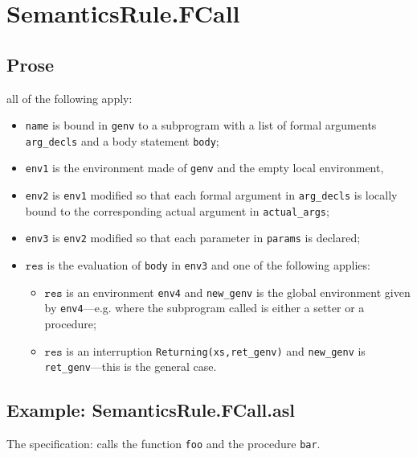 \documentclass{book}
\newcommand\vres[0]{\texttt{res}}
\begin{document}

\section{SemanticsRule.FCall \label{sec:SemanticsRule.FCall}}

  \subsection{Prose}
  all of the following apply:
  \begin{itemize}
  \item \texttt{name} is bound in \texttt{genv} to a subprogram with a list of formal arguments
    \texttt{arg\_decls} and a body statement \texttt{body};
  \item \texttt{env1} is the environment made of \texttt{genv} and the empty local environment,
  \item \texttt{env2} is \texttt{env1} modified so that each formal argument in \texttt{arg\_decls} is
    locally bound to the corresponding actual argument in \texttt{actual\_args};
  \item \texttt{env3} is \texttt{env2} modified so that each parameter in \texttt{params} is declared;
  \item $\vres$ is the evaluation of \texttt{body} in \texttt{env3} and one of the following
    applies:
      \begin{itemize}
      \item $\vres$ is an environment \texttt{env4} and \texttt{new\_genv} is the global environment
        given by \texttt{env4}---e.g. where the subprogram called is either a setter or
        a procedure;
      \item $\vres$ is an interruption \texttt{Returning(xs,ret\_genv)} and \texttt{new\_genv} is
        \texttt{ret\_genv}---this is the general case.
      \end{itemize}
  \end{itemize}

  \subsection{Example: SemanticsRule.FCall.asl}
  The specification:
  calls the function \texttt{foo} and the procedure \texttt{bar}.
\end{document}
